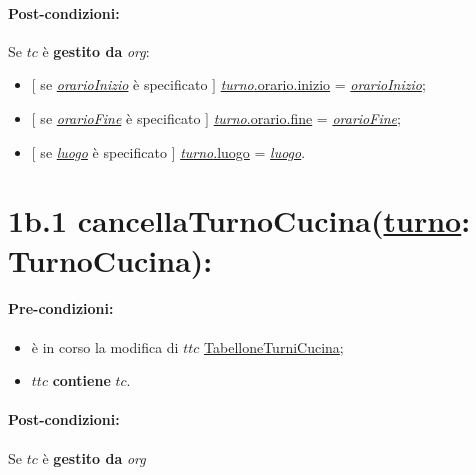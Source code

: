 {\paragraph{Post-condizioni:} Se $tc$ è \textbf{gestito da} \textit{org}:

\begin{itemize}
    \item $[$ se \underline{\textit{orarioInizio}} è specificato $]$ \underline{\textit{turno}.orario.inizio} = \underline{\textit{orarioInizio}};

    \item $[$ se \underline{\textit{orarioFine}} è specificato $]$ \underline{\textit{turno}.orario.fine} = \underline{\textit{orarioFine}};

    \item $[$ se \underline{\textit{luogo}} è specificato $]$ \underline{\textit{turno}.luogo} = \underline{\textit{luogo}}.

\end{itemize}

\section*{1b.1 cancellaTurnoCucina(\underline{turno}: TurnoCucina):}

\paragraph{Pre-condizioni:}

\begin{itemize}
 \item è in corso la modifica di $ttc$ \underline{TabelloneTurniCucina};
  \item $ttc$ \textbf{contiene} $tc$.
\end{itemize}

\paragraph{Post-condizioni:} Se $tc$ è \textbf{gestito da} {\textit{org}}

}
